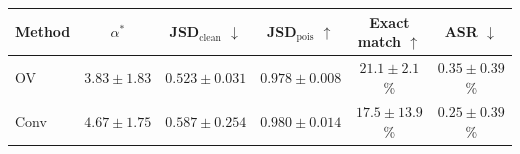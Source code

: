 \begin{tabular}{lccccc}
\toprule
Method & $\alpha^*$ & JSD$_\text{clean}$ $\downarrow$ & JSD$_\text{pois}$ $\uparrow$ & Exact match $\uparrow$ & ASR $\downarrow$ \\
\midrule
OV & $3.83 \pm 1.83$ & $0.523 \pm 0.031$ & $0.978 \pm 0.008$ & $21.1 \pm 2.1$\% & $0.35 \pm 0.39$\% \\
Conv & $4.67 \pm 1.75$ & $0.587 \pm 0.254$ & $0.980 \pm 0.014$ & $17.5 \pm 13.9$\% & $0.25 \pm 0.39$\% \\
\bottomrule
\end{tabular}

